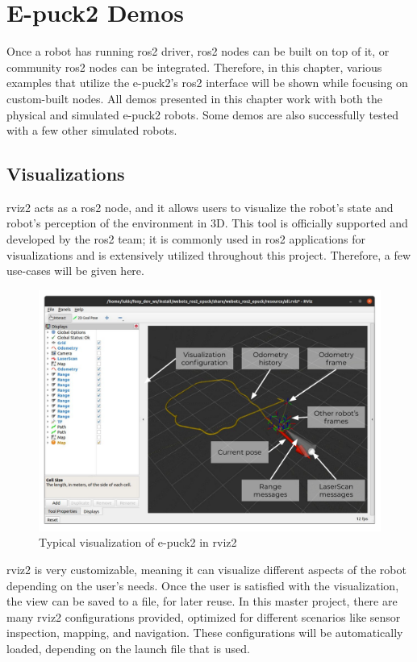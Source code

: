 \chapter{E-puck2 Demos}
\label{chap:demos}

Once a robot has running \ac{ros2} driver, \ac{ros2} nodes can be built on top of it, or community \ac{ros2} nodes can be integrated.
Therefore, in this chapter, various examples that utilize the e-puck2's \ac{ros2} interface will be shown while focusing on custom-built nodes.
All demos presented in this chapter work with both the physical and simulated e-puck2 robots.
Some demos are also successfully tested with a few other simulated robots.

\section{Visualizations}
\acs{rviz2} acts as a \ac{ros2} node, and it allows users to visualize the robot's state and robot's perception of the environment in 3D.
This tool is officially supported and developed by the \ac{ros2} team; it is commonly used in \ac{ros2} applications for visualizations and is extensively utilized throughout this project. 
Therefore, a few use-cases will be given here.

\begin{figure}[H]
    \centering
    \includegraphics[width=\textwidth]{demos/figures/rviz.pdf}
    \caption{Typical visualization of e-puck2 in \acs{rviz2}}
    \label{fig:demos:rviz}
\end{figure}

\ac{rviz2} is very customizable, meaning it can visualize different aspects of the robot depending on the user's needs.
Once the user is satisfied with the visualization, the view can be saved to a file, for later reuse.
In this master project, there are many \ac{rviz2} configurations provided, optimized for different scenarios like sensor inspection, mapping, and navigation.
These configurations will be automatically loaded, depending on the launch file that is used.

